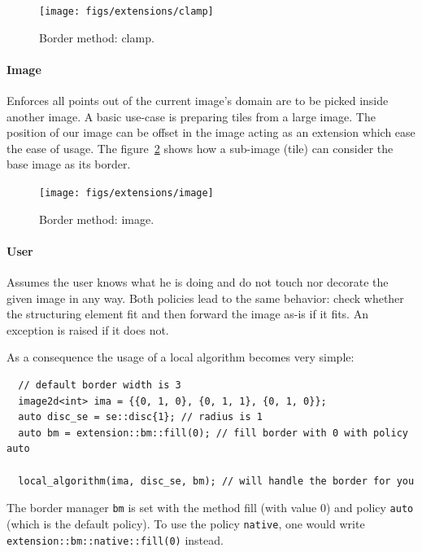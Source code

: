 \begin{figure}[tbh]
  \centering
  \texttt{[image: figs/extensions/clamp]}
  \caption{Border method: clamp.}
  \label{fig:border.clamp}
\end{figure}

\paragraph{Image} Enforces all points out of the current image's domain are to be picked inside another image. A basic
use-case is preparing tiles from a large image. The position of our image can be offset in the image acting as an
extension which ease the ease of usage. The figure~\ref{fig:border.image} shows how a sub-image (tile) can consider the
base image as its border.

\begin{figure}[tbh]
  \centering
  \texttt{[image: figs/extensions/image]}
  \caption{Border method: image.}
  \label{fig:border.image}
\end{figure}


\paragraph{User} Assumes the user knows what he is doing and do not touch nor decorate the given image in any way. Both
policies lead to the same behavior: check whether the structuring element fit and then forward the image as-is if it
fits. An exception is raised if it does not.

As a consequence the usage of a local algorithm becomes very simple:

\begin{verbatim}
  // default border width is 3
  image2d<int> ima = {{0, 1, 0}, {0, 1, 1}, {0, 1, 0}};
  auto disc_se = se::disc{1}; // radius is 1
  auto bm = extension::bm::fill(0); // fill border with 0 with policy auto

  local_algorithm(ima, disc_se, bm); // will handle the border for you
\end{verbatim}

The border manager \texttt{bm} is set with the method fill (with value 0) and policy \texttt{auto} (which is the default
policy). To use the policy \texttt{native}, one would write \texttt{extension::bm::native::fill(0)} instead.


